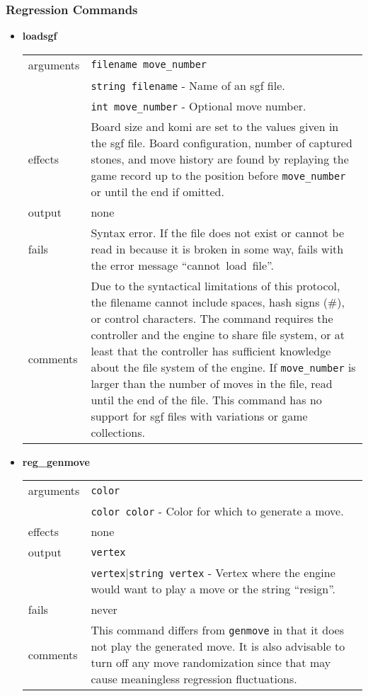 \documentclass[a4paper]{article}
\begin{document}
\subsubsection{Regression Commands}
\label{sec:regression-commands}
\begin{itemize}
\item \textbf{loadsgf} \\
  \begin{tabularx}{\linewidth}{lX}
    arguments &  \texttt{filename move\_number} \\
    & \texttt{string filename} - Name of an sgf file. \\
    & \texttt{int move\_number} - Optional move number. \\
    effects &    Board size and komi are set to the values given in
                 the sgf file. Board configuration, number of
                 captured stones, and move history are found by
                 replaying the game record up to the position before
                 \texttt{move\_number} or until the end if omitted. \\
    output &     none \\
    fails &      Syntax error. If the file does not exist or cannot be
                 read in because it is broken in some way, fails with
                 the error message ``cannot~load~file''. \\
    comments &   Due to the syntactical limitations of this protocol,
                 the filename cannot include spaces, hash signs (\#),
                 or control characters. The command requires the
                 controller and the engine to share file system, or at
                 least that the controller has sufficient knowledge
                 about the file system of the engine. If
                 \texttt{move\_number} is larger than the number of
                 moves in the file, read until the end of the file.
                 This command has no support for sgf files with
                 variations or game collections. \\ 
  \end{tabularx}

\item \textbf{reg\_genmove} \\
  \begin{tabularx}{\linewidth}{lX}
    arguments & \texttt{color} \\
    & \texttt{color color} - Color for which to generate a move. \\
    effects &   none \\
    output &    \texttt{vertex} \\
    & \texttt{vertex$|$string vertex} - Vertex where the engine would
                want to play a move or the string ``resign''. \\
    fails &     never \\
    comments &  This command differs from \texttt{genmove} in that it
                does not play the generated move. It is also advisable
                to turn off any move randomization since that may
                cause meaningless regression fluctuations.
  \end{tabularx}
\end{itemize}
\end{document}
